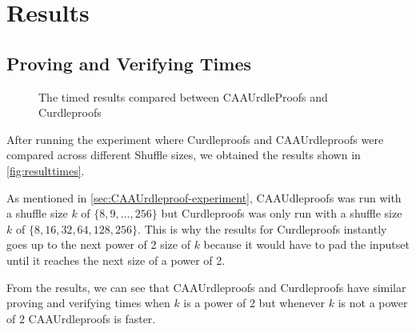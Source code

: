 \section{Results}\label{sec:results}
\subsection{Proving and Verifying Times}\label{subsec:results:provingverifying}

\begin{figure}[!htb]
    \centering
    \qquad
    \caption{The timed results compared between CAAUrdleProofs and Curdleproofs}%
    \label{fig:resulttimes}%
\end{figure}

After running the experiment where Curdleproofs and CAAUrdleproofs were compared across different Shuffle sizes, we obtained the results shown in \autoref{fig:resulttimes}.

As mentioned in \autoref{sec:CAAUrdleproof-experiment}, CAAUdleproofs was run with a shuffle size $k$ of $\{8,9,\dots,256\}$ but Curdleproofs was only run with a shuffle size $k$ of $\{8,16,32,64,128,256\}$.
This is why the results for Curdleproofs instantly goes up to the next power of 2 size of $k$ because it would have to pad the inputset until it reaches the next size of a power of 2.

From the results, we can see that CAAUrdleproofs and Curdleproofs have similar proving and verifying times when $k$ is a power of 2 but whenever $k$ is not a power of 2 CAAUrdleproofs is faster.

